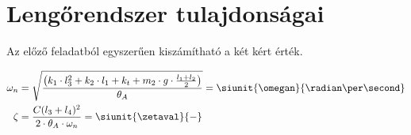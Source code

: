 \section{Lengőrendszer tulajdonságai}

Az előző feladatból egyszerűen kiszámítható a két kért érték.

\begin{align}
    \omega_n & = \sqrt{\frac{\left( k_1 \cdot l_3^2 + k_2 \cdot l_1 + k_t + m_2 \cdot g \cdot \frac{l_1 + l_2}{2} \right)}{\theta_A}} = \siunit{\omegan}{\radian\per\second} \\
    \zeta    & = \frac{C(l_3 + l_4)^2}{2 \cdot \theta_A \cdot \omega_n} = \siunit{\zetaval}{-}
\end{align}